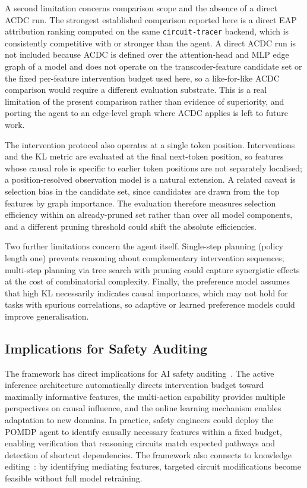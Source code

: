 A second limitation concerns comparison scope and the absence of a direct ACDC
run. The strongest established comparison reported here is a direct EAP attribution
ranking computed on the same \texttt{circuit-tracer} backend, which is consistently
competitive with or stronger than the agent. A direct ACDC run is not included
because ACDC is defined over the attention-head and MLP edge graph of a model and does
not operate on the transcoder-feature candidate set or the fixed per-feature
intervention budget used here, so a like-for-like ACDC comparison would require a
different evaluation substrate. This is a real limitation of the present comparison
rather than evidence of superiority, and porting the agent to an edge-level graph
where ACDC applies is left to future work.

The intervention protocol also operates at a single token position. Interventions and
the KL metric are evaluated at the final next-token position, so features whose causal
role is specific to earlier token positions are not separately localised; a
position-resolved observation model is a natural extension. A related caveat is
selection bias in the candidate set, since candidates are drawn from the top features
by graph importance. The evaluation therefore measures selection efficiency within an
already-pruned set rather than over all model components, and a different pruning
threshold could shift the absolute efficiencies.

Two further limitations concern the agent itself. Single-step planning (policy length
one) prevents reasoning about complementary intervention sequences; multi-step
planning via tree search with pruning could capture synergistic effects at the cost of
combinatorial complexity. Finally, the preference model assumes that high KL
necessarily indicates causal importance, which may not hold for tasks with spurious
correlations, so adaptive or learned preference models could improve generalisation.

\subsection{Implications for Safety Auditing}

The \ACD{} framework has direct implications for AI safety auditing~\cite{Hubinger2019}. The active inference architecture automatically directs intervention budget toward maximally informative features, the multi-action capability provides multiple perspectives on causal influence, and the online learning mechanism enables adaptation to new domains. In practice, safety engineers could deploy the POMDP agent to identify causally necessary features within a fixed budget, enabling verification that reasoning circuits match expected pathways and detection of shortcut dependencies. The framework also connects to knowledge editing~\cite{Meng2022}: by identifying mediating features, targeted circuit modifications become feasible without full model retraining.

